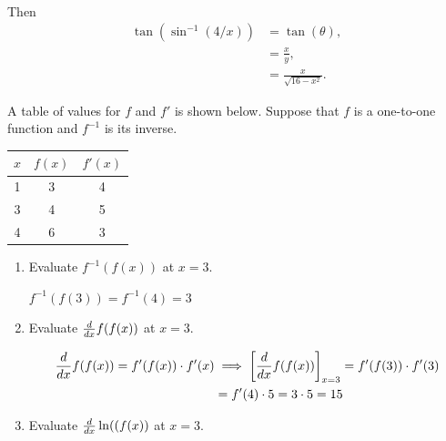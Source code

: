\documentclass[nooutcomes]{ximera}
\begin{document}
\begin{problem}
\begin{enumerate}
\begin{freeResponse}
\begin{align*}
        \end{align*}
        Then
        \begin{align*}
          \tan \left( \sin^{-1} \left(4/x \right) \right) &= \tan( \theta), \\
                                                                   &= \frac{x}{y}, \\
                                                                 &= \frac{x}{\sqrt{16-x^2}}.
        \end{align*}
      \end{freeResponse}
  \end{enumerate}
\end{problem}  

\begin{problem}
  A table of values for $f$ and $f'$ is shown below.
  Suppose that $f$ is a one-to-one function and $f^{-1}$ is its inverse.
  \begin{center}
    \begin{tabular}{ccc}
\hline
      $x$ & $f(x)$ & $f'(x)$\\
\hline \hline
      1 & 3 & 4\\

      3 & 4 & 5\\

      4 & 6 & 3\\
\hline
    \end{tabular}
  \end{center}

  \begin{enumerate}
    \item Evaluate $f^{-1}(f(x))$ at $x = 3$.
      \begin{freeResponse}
         $ f^{-1}(f(3)) = f^{-1}(4) = 3$
      \end{freeResponse}


    \item Evaluate $\frac{d}{dx} f(f(x))$ at $x = 3$.
      \begin{freeResponse}

        \begin{align*}
          \frac{d}{dx} f(f(x)) = f'(f(x)) \cdot f'(x) &\implies \bigg[ \frac{d}{dx} f(f(x)) \bigg]_{x = 3} = f'(f(3)) \cdot f'(3)\\
          &= f'(4) \cdot 5 = 3 \cdot 5 = 15
        \end{align*}
      \end{freeResponse}


    \item Evaluate $\frac{d}{dx}\ln((f(x))$ at $x = 3$.
      \begin{freeResponse}


\end{freeResponse}
\end{enumerate}
\end{problem}
\end{document}
